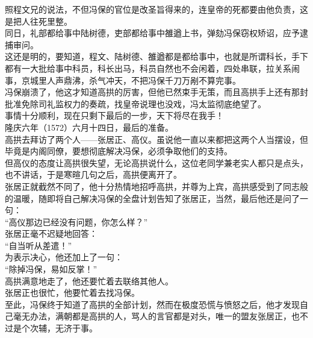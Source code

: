 \begin{multicols}{\theparacolNo}
照程文兄的说法，不但冯保的官位是改圣旨得来的，连皇帝的死都要由他负责，这是把人往死里整。\\

同日，礼部都给事中陆树德，吏部都给事中雒遒上书，弹劾冯保窃权矫诏，应予逮捕审问。\\

这还是明的，要知道，程文、陆树德、雒遒都是都给事中，也就是所谓科长，手下都有一大批给事中科员，科长出马，科员自然也不会闲着，四处串联，拉关系闹事，京城里人声鼎沸，杀气冲天，不把冯保千刀万剐不算完事。\\

冯保崩溃了，他这才知道高拱的厉害，但他已然束手无策，而且高拱手上还有那封批准免除司礼监权力的奏疏，找皇帝说理也没戏，冯太监彻底绝望了。\\

事情十分顺利，现在只剩下最后的一步，天下将尽在我手！\\

隆庆六年（1572）六月十四日，最后的准备。\\

高拱去拜访了两个人——张居正、高仪。虽说他一直以来都把这两个人当摆设，但毕竟是内阁同僚，要想彻底解决冯保，必须争取他们的支持。\\

但高仪的态度让高拱很失望，无论高拱说什么，这位老同学兼老实人都只是点头，也不讲话，于是寒暄几句之后，高拱便离开了。\\

张居正就截然不同了，他十分热情地招呼高拱，并尊为上宾，高拱感受到了同志般的温暖，随即将自己解决冯保的全盘计划告知了张居正，当然，最后他还是问了一句：\\

“高仪那边已经没有问题，你怎么样？”\\

张居正毫不迟疑地回答：\\

“自当听从差遣！”\\

为表示决心，他还加上了一句：\\

“除掉冯保，易如反掌！”\\

高拱满意地走了，他还要忙着去联络其他人。\\

张居正也很忙，他要忙着去找冯保。\\

至此，冯保终于知道了高拱的全部计划，然而在极度恐慌与愤怒之后，他才发现自己毫无办法，满朝都是高拱的人，骂人的言官都是对头，唯一的盟友张居正，也不过是个次辅，无济于事。\\


\end{multicols}
